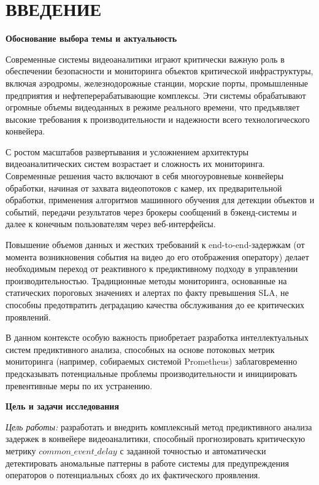 \newpage
\chapter*{ВВЕДЕНИЕ}  


\textbf{Обоснование выбора темы и актуальность}

\hspace*{1.25cm}Современные системы видеоаналитики играют критически важную роль в обеспечении безопасности и мониторинга объектов критической инфраструктуры, включая аэродромы, железнодорожные станции, морские порты, промышленные предприятия и нефтеперерабатывающие комплексы. Эти системы обрабатывают огромные объемы видеоданных в режиме реального времени, что предъявляет высокие требования к производительности и надежности всего технологического конвейера.

\hspace*{1.25cm}С ростом масштабов развертывания и усложнением архитектуры видеоаналитических систем возрастает и сложность их мониторинга. Современные решения часто включают в себя многоуровневые конвейеры обработки, начиная от захвата видеопотоков с камер, их предварительной обработки, применения алгоритмов машинного обучения для детекции объектов и событий, передачи результатов через брокеры сообщений в бэкенд-системы и далее к конечным пользователям через веб-интерфейсы.

\hspace*{1.25cm}Повышение объемов данных и жестких требований к end-to-end-задержкам (от момента возникновения события на видео до его отображения оператору) делает необходимым переход от реактивного к предиктивному подходу в управлении производительностью. Традиционные методы мониторинга, основанные на статических пороговых значениях и алертах по факту превышения SLA, не способны предотвратить деградацию качества обслуживания до ее критических проявлений.

\hspace*{1.25cm}В данном контексте особую важность приобретает разработка интеллектуальных систем предиктивного анализа, способных на основе потоковых метрик мониторинга (например, собираемых системой Prometheus) заблаговременно предсказывать потенциальные проблемы производительности и инициировать превентивные меры по их устранению.

\textbf{Цель и задачи исследования}

\hspace*{1.25cm}\textit{Цель работы:} разработать и внедрить комплексный метод предиктивного анализа задержек в конвейере видеоаналитики, способный прогнозировать критическую метрику $common\_event\_delay$ с заданной точностью и автоматически детектировать аномальные паттерны в работе системы для предупреждения операторов о потенциальных сбоях до их фактического проявления.

